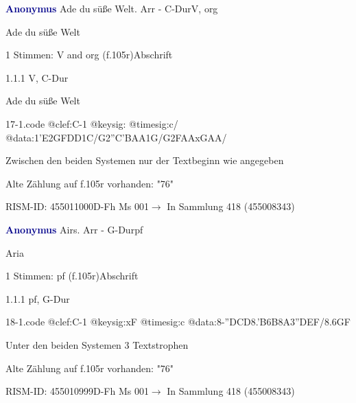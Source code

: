 \documentclass[twocolumn, 12pt]{book}
\begin{document}
\par \vspace{16pt} \textcolor{darkblue}{\textbf{Anonymus  }}\hfillplus{\textbf{[17]}}\newline Ade du süße Welt. Arr - C-Dur\newline V, org
\par \begin{itshape} Ade du süße Welt\end{itshape} 
\par \textcolor{darkblue}{}  1 Stimmen: V and org  (f.105r)\newline Abschrift
\par 1.1.1  V, C-Dur\newline \begin{footnotesize} Ade du süße Welt \end{footnotesize}  
\begin{filecontents*}{17-1.code}
@clef:C-1
@keysig:
@timesig:c/
@data:1'E2GFDD1C/G2''C'BAA1G/G2FAAxGAA/
\end{filecontents*}
\newline %
\par Zwischen den beiden Systemen nur der Textbeginn wie angegeben
\par Alte Zählung auf f.105r vorhanden: "76"
\par RISM-ID: 455011000\newline D-Fh  Ms 001\newline $\rightarrow$ In Sammlung 418 (455008343)
      
\par \vspace{16pt} \textcolor{darkblue}{\textbf{Anonymus  }}\hfillplus{\textbf{[18]}}\newline Airs. Arr - G-Dur\newline pf
\par \begin{itshape} Aria\end{itshape} 
\par \textcolor{darkblue}{}  1 Stimmen: pf  (f.105r)\newline Abschrift
\par 1.1.1  pf, G-Dur  
\begin{filecontents*}{18-1.code}
@clef:C-1
@keysig:xF
@timesig:c
@data:8-''D{CD}{8.'B6B}8A{3''DEF}/{8.6GF}
\end{filecontents*}
\newline %
\par Unter den beiden Systemen 3 Textstrophen
\par Alte Zählung auf f.105r vorhanden: "76"
\par RISM-ID: 455010999\newline D-Fh  Ms 001\newline $\rightarrow$ In Sammlung 418 (455008343)
      
\end{document}
